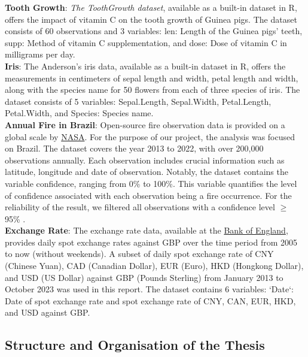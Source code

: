 \documentclass{article}\usepackage[]{graphicx}\usepackage[]{xcolor}
\begin{document}
\noindent
\textbf{Tooth Growth}: \textit{The ToothGrowth dataset}, available as a built-in dataset in R, offers the impact of vitamin C on the tooth growth of Guinea pigs. The dataset consists of 60 observations and 3 variables: len: Length of the Guinea pigs' teeth, supp: Method of vitamin C supplementation, and dose: Dose of vitamin C in milligrams per day.\\

\noindent
\textbf{Iris}: The Anderson's iris data, available as a built-in dataset in R, offers the measurements in centimeters of sepal length and width, petal length and width, along with the species name for 50 flowers from each of three species of iris. The dataset consists of 5 variables: Sepal.Length, Sepal.Width, Petal.Length, Petal.Width, and Species: Species name.\\

\noindent
\textbf{Annual Fire in Brazil}: Open-source fire observation data is provided on a global scale by \href{https://firms.modaps.eosdis.nasa.gov/}{NASA}. For the purpose of our project, the analysis was focused on Brazil. The dataset covers the year 2013 to 2022, with over 200,000 observations annually. Each observation includes crucial information such as latitude, longitude and date of observation. Notably, the dataset contains the variable confidence, ranging from 0\% to 100\%. This variable quantifies the level of confidence associated with each observation being a fire occurrence. For the reliability of the result, we filtered all observations with a confidence level $\ge$ 95\% \cite{nasa_confidence}.\\

\noindent
\textbf{Exchange Rate}: The exchange rate data, available at the \href{https://www.bankofengland.co.uk/boeapps/database/index.asp?first=yes&SectionRequired=I&HideNums=-1&ExtraInfo=true&Travel=NIx}{Bank of England}, provides daily spot exchange rates against GBP over the time period from 2005 to now (without weekends). A subset of daily spot exchange rate of CNY (Chinese Yuan), CAD (Canadian Dollar), EUR (Euro), HKD (Hongkong Dollar), and USD (US Dollar) against GBP (Pounds Sterling) from January 2013 to October 2023 was used in this report. The dataset contains 6 variables: `Date`: Date of spot exchange rate and spot exchange rate of CNY, CAN, EUR, HKD, and USD against GBP.\\


\subsection{Structure and Organisation of the Thesis}
\end{document}
